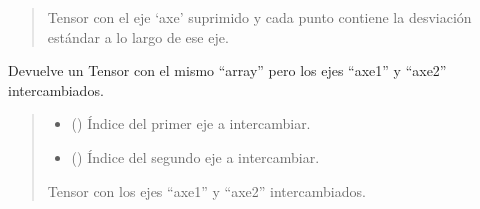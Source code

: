 \documentclass[letterpaper,10pt,english]{sphinxmanual}
\begin{document}
\begin{fulllineitems}
\begin{fulllineitems}
\begin{quote}
\begin{description}
\sphinxAtStartPar
Tensor con el eje ‘axe’ suprimido y cada punto contiene la desviación estándar a lo largo de ese eje.

\sphinxAtStartPar
{\hyperref[\detokenize{utils.tensor:utils.tensor.Tensor}]{}}

\end{description}\end{quote}

\end{fulllineitems}


\begin{fulllineitems}
\label{\detokenize{utils.tensor:utils.tensor.Tensor.swap}}
\pysigstartsignatures
{}
\pysigstopsignatures
\sphinxAtStartPar
Devuelve un Tensor con el mismo “array” pero los ejes “axe1” y “axe2” intercambiados.
\begin{quote}\begin{description}
\begin{itemize}
\item {} 
\sphinxAtStartPar
{} () \textendash{} Índice del primer eje a intercambiar.

\item {} 
\sphinxAtStartPar
{} () \textendash{} Índice del segundo eje a intercambiar.

\end{itemize}

\sphinxAtStartPar
Tensor con los ejes “axe1” y “axe2” intercambiados.

\sphinxAtStartPar
{\hyperref[\detokenize{utils.tensor:utils.tensor.Tensor}]{}}

\end{description}\end{quote}

\end{fulllineitems}



\end{fulllineitems}
\end{document}
